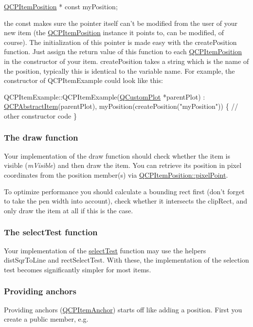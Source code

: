 \begin{DoxyCode}
\hyperlink{classQCPItemPosition}{QCPItemPosition} * \textcolor{keyword}{const} myPosition;
\end{DoxyCode}


the const makes sure the pointer itself can't be modified from the user of your new item (the \hyperlink{classQCPItemPosition}{Q\-C\-P\-Item\-Position} instance it points to, can be modified, of course). The initialization of this pointer is made easy with the create\-Position function. Just assign the return value of this function to each \hyperlink{classQCPItemPosition}{Q\-C\-P\-Item\-Position} in the constructor of your item. create\-Position takes a string which is the name of the position, typically this is identical to the variable name. For example, the constructor of Q\-C\-P\-Item\-Example could look like this\-:


\begin{DoxyCode}
QCPItemExample::QCPItemExample(\hyperlink{classQCustomPlot}{QCustomPlot} *parentPlot) :
  \hyperlink{classQCPAbstractItem}{QCPAbstractItem}(parentPlot),
  myPosition(createPosition(\textcolor{stringliteral}{"myPosition"}))
\{
  \textcolor{comment}{// other constructor code}
\}
\end{DoxyCode}
\hypertarget{classQCPAbstractItem_items-drawing}{}\subsubsection{The draw function}\label{classQCPAbstractItem_items-drawing}
Your implementation of the draw function should check whether the item is visible ({\itshape m\-Visible}) and then draw the item. You can retrieve its position in pixel coordinates from the position member(s) via \hyperlink{classQCPItemPosition_ae490f9c76ee2ba33752c495d3b6e8fb5}{Q\-C\-P\-Item\-Position\-::pixel\-Point}.

To optimize performance you should calculate a bounding rect first (don't forget to take the pen width into account), check whether it intersects the clip\-Rect, and only draw the item at all if this is the case.\hypertarget{classQCPAbstractItem_items-selection}{}\subsubsection{The select\-Test function}\label{classQCPAbstractItem_items-selection}
Your implementation of the \hyperlink{classQCPAbstractItem_a2e19e88f67f4ba9c13b7e33bd447c075}{select\-Test} function may use the helpers dist\-Sqr\-To\-Line and rect\-Select\-Test. With these, the implementation of the selection test becomes significantly simpler for most items.\hypertarget{classQCPAbstractItem_anchors}{}\subsubsection{Providing anchors}\label{classQCPAbstractItem_anchors}
Providing anchors (\hyperlink{classQCPItemAnchor}{Q\-C\-P\-Item\-Anchor}) starts off like adding a position. First you create a public member, e.\-g.



